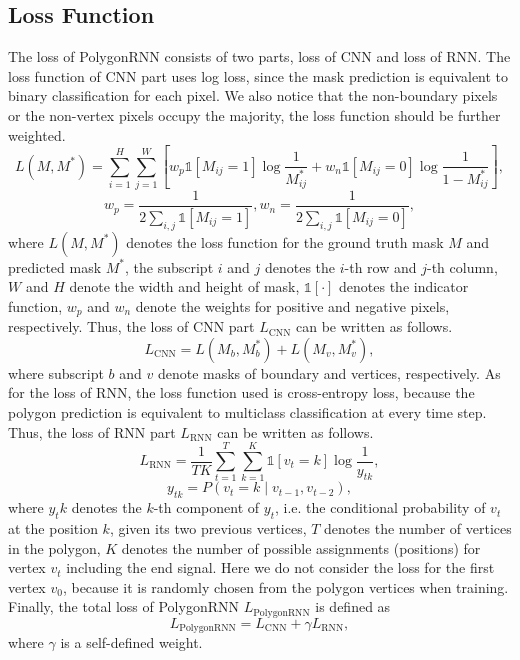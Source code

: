\subsection{Loss Function}\label{losspoly}
The loss of PolygonRNN consists of two parts, loss of CNN and loss of RNN. The loss function of CNN part uses log loss, since the mask prediction is equivalent to binary classification for each pixel. We also notice that the non-boundary pixels or the non-vertex pixels occupy the majority, the loss function should be further weighted.
\begin{equation}
	L(M, M^*) = \sum_{i=1}^H\sum_{j=1}^W \left[w_p\mathbb{1}[M_{ij} = 1]\log{\frac{1}{M^*_{ij}}} + w_n\mathbb{1}[M_{ij} = 0]\log{\frac{1}{1-M^*_{ij}}} \right],
\end{equation}
\begin{equation}
	w_p = \frac{1}{2\sum_{i, j}\mathbb{1}[M_{ij} = 1]}, w_n = \frac{1}{2\sum_{i, j}\mathbb{1}[M_{ij} = 0]},
\end{equation}
where $L(M, M^*)$ denotes the loss function for the ground truth mask $M$ and predicted mask $M^*$, the subscript $i$ and $j$ denotes the $i$-th row and $j$-th column, $W$ and $H$ denote the width and height of mask, $\mathbb{1}[\cdot]$ denotes the indicator function, $w_p$ and $w_n$ denote the weights for positive and negative pixels, respectively. Thus, the loss of CNN part $L_{\text{CNN}}$ can be written as follows.
\begin{equation}
	L_{\text{CNN}} = L(M_b, M^*_b) + L(M_v, M^*_v),
\end{equation}
where subscript $b$ and $v$ denote masks of boundary and vertices, respectively. As for the loss of RNN, the loss function used is cross-entropy loss, because the polygon prediction is equivalent to multiclass classification at every time step. Thus, the loss of RNN part $L_{\text{RNN}}$ can be written as follows.
\begin{equation}
	L_{\text{RNN}} = \frac{1}{TK} \sum_{t=1}^T\sum_{k=1}^K\mathbb{1}[v_{t} = k]\log{\frac{1}{y_{tk}}},
\end{equation}
\begin{equation}
	y_{tk} = P(v_t = k \mid v_{t-1}, v_{t-2}),
\end{equation}
where $y_tk$ denotes the $k$-th component of $y_t$, i.e. the conditional probability of $v_t$ at the position $k$, given its two previous vertices, $T$ denotes the number of vertices in the polygon, $K$ denotes the number of possible assignments (positions) for vertex $v_t$ including the end signal. Here we do not consider the loss for the first vertex $v_0$, because it is randomly chosen from the polygon vertices when training. Finally, the total loss of PolygonRNN $L_{\text{PolygonRNN}}$ is defined as
\begin{equation}
	L_{\text{PolygonRNN}} = L_{\text{CNN}} + \gamma L_{\text{RNN}},
\end{equation}
where $\gamma$ is a self-defined weight.

